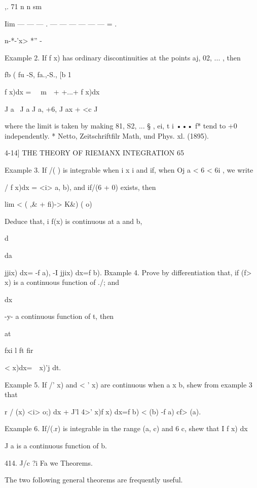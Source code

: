 ,. 71 n n sm    

Iim — — — . —  — —  —    — — = . 

n-*-'x> *'' -  

Example 2. If f x) has ordinary discontinuities at the points aj, 02, ...   , then 

fb ( fu -S, fa.,-S., [b 1 

f x)dx = \ \  m\ \  + +...+ f x)dx\, 

J a \ J a J a, +6, J ax +  <c J 

where the limit is taken by making 81, S2, ... § , ei, t i ••• f* tend to +0 independently. 
* Netto, Zeitschriftfilr Math, und Phys. xl. (1895). 



4-14] THE THEORY OF RIEMANX INTEGRATION 65 

Example 3. If /( ) is integrable when  i   x  i and if, when Oj   a < 6 < 6i , we write 

/ f x)dx = <i> a, b), 
and if/(6 + 0) exists, then 



lim < ( ,\& + fi)-> K\&) ( o)  

Deduce that, i f(x) is continuous at a and b, 

d\  

da 



jjix) dx= -f a), -I jjix) dx=f b). 
Bxample 4. Prove by differentiation that, if (f>  x) is a continuous function of ./; and 



dx 

-y- a continuous function of t, then 

at 



fxi l ft fir 

 <  x)dx=\ \     x)'j dt. 



Example 5. If /'  x) and < '  x) are continuous when a x b, shew from example 3 
that 

r / (x) <i>  o;) dx + J'l 4>'  x)f x) dx=f  b) <  (b) -f a) cf> (a). 

Example 6. If/(.r) is integrable in the range (a, c) and   6  c, shew that I f  x) dx 

J a 
is a continuous function of b. 

414. J/c ?i Fa we Theorems. 

The two following general theorems are frequently useful. 

